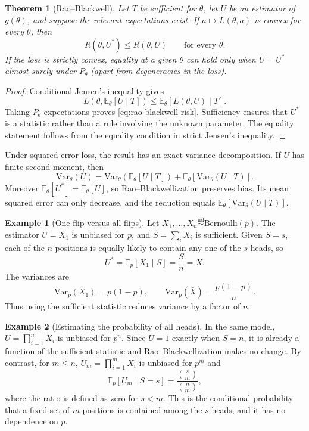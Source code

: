 \documentclass[12pt,oneside]{book}
\numberwithin{equation}{section}
\theoremstyle{definition}
\newtheorem{example}{Example}[section]
\theoremstyle{plain}
\newtheorem{theorem}{Theorem}[section]
\theoremstyle{remark}
\newcommand{\E}{\mathbb{E}}
\newcommand{\Var}{\mathrm{Var}}
\newcommand{\iid}{\overset{\text{iid}}{\sim}}
\newcommand{\Bern}{\mathrm{Bernoulli}}
\begin{document}
\begin{theorem}[Rao--Blackwell]
Let $T$ be sufficient for $\theta$, let $U$ be an estimator of $g(\theta)$,
and suppose the relevant expectations exist.  If
$a\mapsto L(\theta,a)$ is convex for every $\theta$, then
\begin{equation}
    R(\theta,U^*)\leq R(\theta,U)
    \qquad\text{for every }\theta.
    \label{eq:rao-blackwell-risk}
\end{equation}
If the loss is strictly convex, equality at a given $\theta$ can hold only
when $U=U^*$ almost surely under $P_\theta$ (apart from degeneracies in the
loss).
\end{theorem}

\begin{proof}
Conditional Jensen's inequality gives
\[
 L\!\left(\theta,\E_\theta[U\mid T]\right)
 \leq \E_\theta[L(\theta,U)\mid T].
\]
Taking $P_\theta$-expectations proves \eqref{eq:rao-blackwell-risk}.
Sufficiency ensures that $U^*$ is a statistic rather than a rule involving
the unknown parameter.  The equality statement follows from the equality
condition in strict Jensen's inequality.
\end{proof}

Under squared-error loss, the result has an exact variance decomposition.  If
$U$ has finite second moment, then
\begin{equation}
    \Var_\theta(U)
    =\Var_\theta\!\left(\E_\theta[U\mid T]\right)
     +\E_\theta\!\left[\Var_\theta(U\mid T)\right].
    \label{eq:total-variance-rb}
\end{equation}
Moreover $\E_\theta[U^*]=\E_\theta[U]$, so Rao--Blackwellization preserves
bias.  Its mean squared error can only decrease, and the reduction equals
$\E_\theta[\Var_\theta(U\mid T)]$.

\begin{example}[One flip versus all flips]
Let $X_1,\ldots,X_n\iid\Bern(p)$.  The estimator $U=X_1$ is unbiased for $p$,
and $S=\sum_iX_i$ is sufficient.  Given $S=s$, each of the $n$ positions is
equally likely to contain any one of the $s$ heads, so
\[
    U^*=\E_p[X_1\mid S]=\frac{S}{n}=\bar X.
\]
The variances are
\[
    \Var_p(X_1)=p(1-p),
    \qquad
    \Var_p(\bar X)=\frac{p(1-p)}{n}.
\]
Thus using the sufficient statistic reduces variance by a factor of $n$.
\end{example}

\begin{example}[Estimating the probability of all heads]
In the same model, $U=\prod_{i=1}^nX_i$ is unbiased for $p^n$.  Since $U=1$
exactly when $S=n$, it is already a function of the sufficient statistic and
Rao--Blackwellization makes no change.  By contrast, for $m\leq n$,
$U_m=\prod_{i=1}^mX_i$ is unbiased for $p^m$ and
\[
    \E_p[U_m\mid S=s]
    =\frac{\binom{s}{m}}{\binom{n}{m}},
\]
where the ratio is defined as zero for $s<m$.  This is the conditional
probability that a fixed set of $m$ positions is contained among the $s$
heads, and it has no dependence on $p$.
\end{example}
\end{document}

